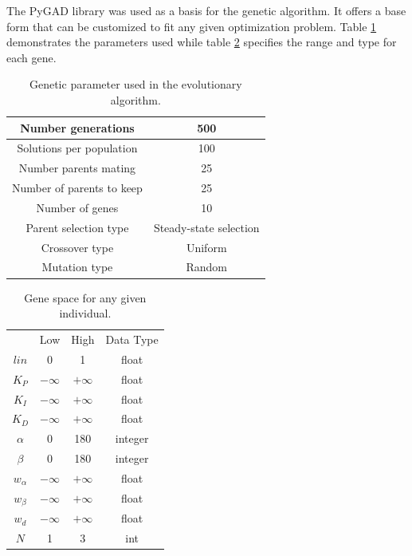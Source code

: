 \documentclass[runningheads]{llncs}
\begin{document}
The PyGAD \cite{gad2021pygad} library was used as a basis for the genetic algorithm. It offers a base form that can be customized to fit any given optimization problem. Table \ref{tab:genetic_params} demonstrates the parameters used while table \ref{tab:gene_space} specifies the range and type for each gene. 

\begin{table}
\centering
\caption{Genetic parameter used in the evolutionary algorithm.}
\label{tab:genetic_params}
\begin{tabular}{cc}
Number generations       & 500                           \\ \hline
Solutions per population & 100                            \\ \hline
Number parents mating    & 25                             \\ \hline
Number of parents to keep    & 25                             \\ \hline
Number of genes          & 10                              \\ \hline
Parent selection type    & Steady-state selection \\ \hline
Crossover type           & Uniform                        \\ \hline
Mutation type            & Random                         \\ \hline
\end{tabular}
\end{table}

\begin{table}
\centering
\caption{Gene space for any given individual.}
\label{tab:gene_space}
\begin{tabular}{cccc}
        & Low   & High  & Data Type    \\ \cline{2-4} 
$lin$   & 0     & 1     & float   \\ \hline
$K_P$   & $- \infty$ & $+ \infty$ & float   \\ \hline
$K_I$   & $- \infty$ & $+ \infty$ & float   \\ \hline
$K_D$   & $- \infty$ & $+ \infty$ & float   \\ \hline
$\alpha$ & 0     & 180   & integer \\ \hline
$\beta$  & 0     & 180   & integer \\ \hline
$w_\alpha$     & $- \infty$ & $+ \infty$ & float   \\ \hline
$w_\beta$     & $- \infty$ & $+ \infty$ & float   \\ \hline
$w_d$     & $- \infty$ & $+ \infty$ & float   \\ \hline
$N$     & 1     & 3     & int   \\ \hline
\end{tabular}
\end{table}
\end{document}
